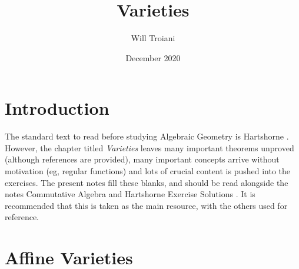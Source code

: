 \documentclass[12pt]{article}
\title{Varieties}
\author{Will Troiani}
\date{December 2020}
\theoremstyle{plain}
\theoremstyle{definition}
\begin{document}
\maketitle
\tableofcontents
\section{Introduction}
The standard text to read before studying Algebraic Geometry is Hartshorne \cite{hartshorne}. However, the chapter titled \emph{Varieties} leaves many important theorems unproved (although references are provided), many important concepts arrive without motivation (eg, regular functions) and lots of crucial content is pushed into the exercises. The present notes fill these blanks, and should be read alongside the notes Commutative Algebra \cite{algebra} and Hartshorne Exercise Solutions \cite{hartshorne_solutions}. It is recommended that this is taken as the main resource, with the others used for reference.
\section{Affine Varieties}
\end{document}
